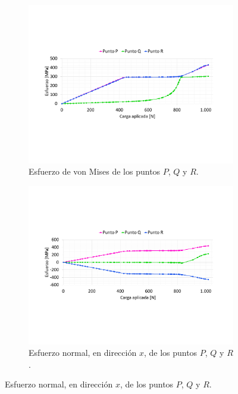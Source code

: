 \begin{figure}[p]
\centering
	\begin{subfigure}{1\linewidth}
		\centering
		\includegraphics[width=\linewidth, trim={2cm 5cm 2cm 5cm},clip]{Imagenes/esfpqr_vm.pdf}
		\caption{Esfuerzo de von Mises de los puntos $P$, $Q$ y $R$.}
		\label{fig:esfpqr_vm}
	\end{subfigure}
	\begin{subfigure}{1\linewidth}
		\centering
		\includegraphics[width=\linewidth, trim={2cm 5cm 2cm 5cm},clip]{Imagenes/esfpqr_normal.pdf}
		\caption{Esfuerzo normal, en dirección $x$, de los puntos $P$, $Q$ y $R$.}
		\label{fig:esfpqr_normal}
	\end{subfigure}

\end{figure}
